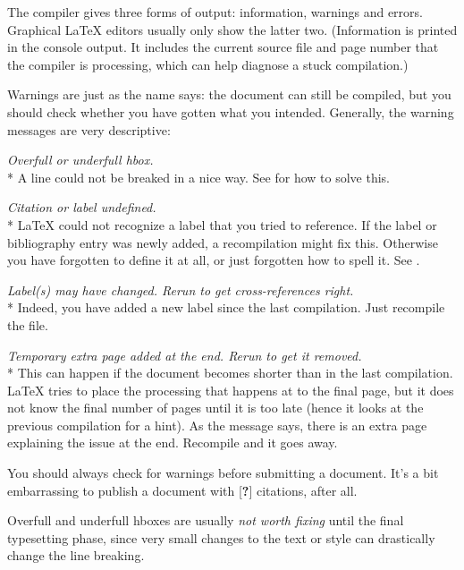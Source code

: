 The compiler gives three forms of output: information, warnings and errors.
Graphical \LaTeX{} editors usually only show the latter two.
(Information is printed in the console output.
It includes the current source file and page number that the compiler is processing,
which can help diagnose a stuck compilation.)

Warnings are just as the name says: the document can still be compiled,
but you should check whether you have gotten what you intended.
Generally, the warning messages are very descriptive:

\medskip\noindent\emph{Overfull or underfull hbox.}\\*
A line could not be breaked in a nice way.
See  for how to solve this.

\medskip\noindent\emph{Citation or label undefined.}\\*
\LaTeX{} could not recognize a label that you tried to reference.
If the label or bibliography entry was newly added, a recompilation might fix this.
Otherwise you have forgotten to define it at all, or just forgotten how to spell it.
See .

\medskip\noindent\emph{Label(s) may have changed. Rerun to get cross-references right.}\\*
Indeed, you have added a new label since the last compilation.
Just recompile the file.

\medskip\noindent\emph{Temporary extra page added at the end. Rerun to get it removed.}\\*
This can happen if the document becomes shorter than in the last compilation.
\LaTeX{} tries to place the processing that happens at \verb||
to the final page, but it does not know the final number of pages until it is too late
(hence it looks at the previous compilation for a hint).
As the message says, there is an extra page explaining the issue at the end.
Recompile and it goes away.


\begin{practices}
You should always check for warnings before submitting a document.
It's a bit embarrassing to publish a document with [\textbf{?}] citations, after all.

Overfull and underfull hboxes are usually \emph{not worth fixing}
until the final typesetting phase,
since very small changes to the text or style can drastically change the line breaking.
\end{practices}


